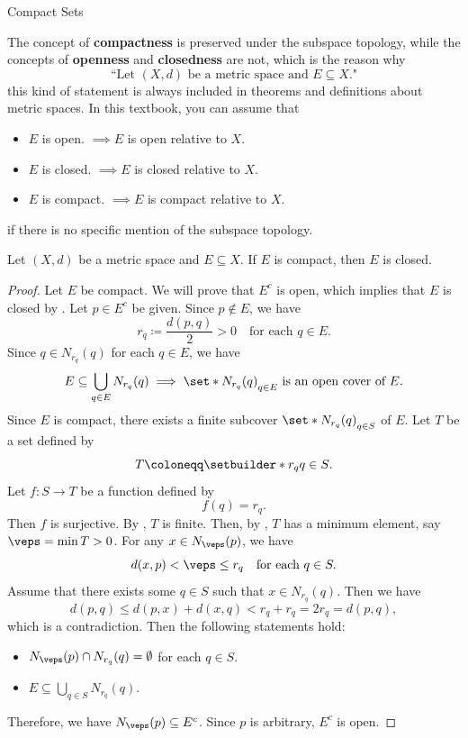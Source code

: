 \begin{section}{Compact Sets}
\begin{remark}
    The concept of \textbf{compactness} is preserved under the subspace topology, while
    the concepts of \textbf{openness} and \textbf{closedness} are not, which is the reason why
    \[
    \text{``Let $(X, d)$ be a metric space and $E \subseteq X$."}
    \]
    this kind of statement is always included in theorems and definitions about metric spaces.
    In this textbook, you can assume that
    \begin{itemize}
        \item $E$ is open. $\implies E$ is open relative to $X$.
        \item $E$ is closed. $\implies E$ is closed relative to $X$.
        \item $E$ is compact. $\implies E$ is compact relative to $X$.
    \end{itemize}
    if there is no specific mention of the subspace topology.
\end{remark}

\bigskip

\begin{theorem} \label{thm:CompactSetIsClosed}
    Let $(X, d)$ be a metric space and $E \subseteq X$. If $E$ is compact, then $E$ is closed.
\end{theorem}

\begin{proof}
    Let $E$ be compact. We will prove that $E^{c}$ is open, which implies that $E$ is closed
    by . Let $p \in E^{c}$ be given. Since $p \notin E$, we have 
    \[
    r_{q} \coloneqq \frac{d(p, q)}{2} > 0 \quad \text{for each } q \in E.
    \]
    Since $q \in N_{r_{q}}(q)$ for each $q \in E$, we have
    \[
    E \subseteq  \bigcup_{q \in E} N_{r_{q}}(q) \implies
    \set*{N_{r_{q}}(q)}_{q \in E} \text{ is an open cover of } E.
    \]
    Since $E$ is compact, there exists a finite subcover $\set*{N_{r_{q}}(q)}_{q \in S}$ of $E$.
    Let $T$ be a set defined by
    \[
    T \coloneqq \setbuilder*{r_{q}}{q \in S}.
    \]
    Let $f: S \to T$ be a function defined by
    \[
    f(q) = r_{q}.
    \]
    Then $f$ is surjective. By , $T$ is finite. Then, by
    , $T$ has a minimum element, say $\veps = \min T > 0$. 
    For any $x \in N_{\veps}(p)$, we have
    \[
    d(x, p) < \veps \leq r_{q} \quad \text{for each } q \in S.
    \]
    Assume that there exists some $q \in S$ such that $x \in N_{r_{q}}(q)$. Then we have
    \[
    d(p, q) \leq d(p, x) + d(x, q) < r_{q} + r_{q} = 2r_{q} = d(p, q),
    \]
    which is a contradiction. Then the following statements hold:
    \begin{itemize}
        \item $N_{\veps}(p) \cap N_{r_{q}}(q) = \emptyset$ for each $q \in S$.
        \item $E \subseteq \displaystyle \bigcup_{q \in S} N_{r_{q}}(q)$.
    \end{itemize}
    Therefore, we have $N_{\veps}(p) \subseteq E^{c}$. Since $p$ is arbitrary, $E^{c}$ is open.
\end{proof}


\end{section}
